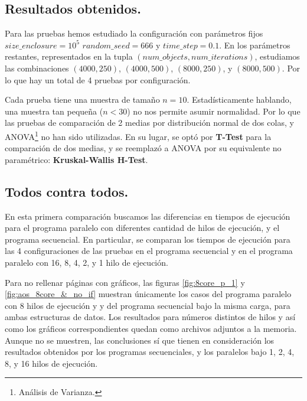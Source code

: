 \documentclass{article}
\begin{document}
\subsection{Resultados obtenidos.}
Para las pruebas hemos estudiado la configuración con parámetros fijos ${size\_enclosure}=10^5$ ${random\_seed}=666$ y
${time\_step}=0.1$. En los parámetros restantes, representados en la tupla $({num\_objects}, {num\_iterations})$,
estudiamos las combinaciones $(4000, 250)$, $(4000, 500)$, $(8000, 250)$, y $(8000, 500)$. Por lo que hay
un total de 4 pruebas por configuración.

Cada prueba tiene una muestra de tamaño ${n}=10$. Estadísticamente
hablando, una muestra tan pequeña ($n < 30$) no nos permite asumir normalidad.
Por lo que las pruebas de comparación de 2 medias por distribución normal de dos colas, y ANOVA\footnote{Análisis de Varianza.}
no han sido utilizadas. En su lugar, se optó por \textbf{T-Test} para la comparación de dos medias, y se reemplazó a ANOVA
por su equivalente no paramétrico: \textbf{Kruskal-Wallis H-Test}.

\subsection{Todos contra todos.\label{kruskal}}
En esta primera comparación buscamos las diferencias en tiempos de ejecución para el programa
paralelo con diferentes cantidad de hilos de ejecución, y el programa secuencial. En particular, se comparan
los tiempos de ejecución para las 4 configuraciones de las pruebas en el programa secuencial y en el programa paralelo
con 16, 8, 4, 2, y 1 hilo de ejecución.

Para no rellenar páginas con gráficos, las figuras \ref{fig:8core_p_1} y \ref{fig:aos_8core_&_no_if} muestran únicamente los casos del programa paralelo con 8 hilos de ejecución y
y del programa secuencial bajo la misma carga, para ambas estructuras de datos. Los resultados para números distintos de hilos y
así como los gráficos correspondientes quedan como archivos adjuntos a la memoria. Aunque no se muestren, las
conclusiones sí que tienen en consideración los resultados obtenidos por los programas secuenciales, y los paralelos bajo 1, 2, 4, 8, y 16 hilos de ejecución.
\end{document}
